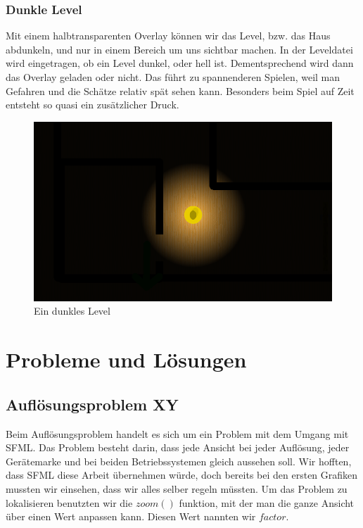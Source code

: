 \documentclass[12pt,a4paper]{scrartcl}
\begin{document}
\subsubsection{Dunkle Level}
Mit einem halbtransparenten Overlay können wir das Level, bzw. das Haus abdunkeln, und nur in einem Bereich um uns
sichtbar machen. In der Leveldatei wird eingetragen, ob ein Level dunkel, oder hell ist. Dementsprechend wird dann das
Overlay geladen oder nicht. Das führt zu spannenderen Spielen, weil man Gefahren und die Schätze relativ spät sehen kann.
Besonders beim Spiel auf Zeit entsteht so quasi ein zusätzlicher Druck.

\begin{figure}[h]
\centering
\includegraphics[scale=0.5]{img/dunkel.png}
\caption{Ein dunkles Level}
\end{figure}
\newpage


\section{Probleme und Lösungen}
\subsection{Auflösungsproblem XY}
Beim Auflösungsproblem handelt es sich um ein Problem mit dem Umgang mit SFML.
Das Problem besteht darin, dass jede Ansicht bei jeder Auflösung, jeder Gerätemarke und bei beiden Betriebssystemen gleich aussehen soll.
Wir hofften, dass SFML diese Arbeit übernehmen würde, doch bereits bei den ersten Grafiken mussten wir einsehen, dass wir alles selber regeln müssten.
Um das Problem zu lokalisieren benutzten wir die $zoom()$ funktion, mit der man die ganze Ansicht über einen Wert anpassen kann.
Diesen Wert nannten wir $factor$.
\end{document}
